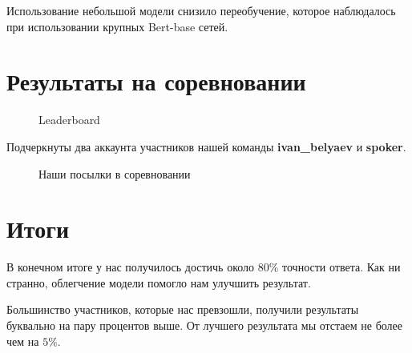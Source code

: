 \documentclass[12pt]{article}
\newcommand{\imgh}[3]
{
\begin{figure}[H]
\center{\texttt{[image: \#2]}}
\caption{#3}
\label{ris:#2}
\end{figure}
}
\begin{document}
Использование небольшой модели снизило переобучение, которое наблюдалось при использовании крупных Bert-base сетей.

\newpage

\section{Результаты на соревновании}

\imgh{16cm}{submits.png}{Leaderboard}

Подчеркнуты два аккаунта участников нашей команды \textbf{ivan\_belyaev} и \textbf{spoker}.

\imgh{16cm}{scores.png}{Наши посылки в соревновании}


\newpage

\section{Итоги}

В конечном итоге у нас получилось достичь около 80$\%$ точности ответа. Как ни странно, облегчение модели помогло нам улучшить результат. 

Большинство участников, которые нас превзошли, получили результаты буквально на пару процентов выше. От лучшего результата мы отстаем не более чем на $5\%$.
\end{document}
